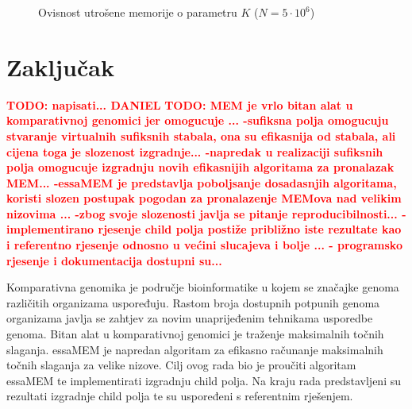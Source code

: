 \documentclass[times, utf8, seminar, numeric]{fer}
\newcommand\todo[1]{\textbf{\textcolor{red}{TODO: #1}}}
\begin{document}
\begin{figure}[!h]
	\centering
	\def\svgwidth{.7\columnwidth}
	
  \caption{Ovisnost utrošene memorije o parametru $K$ ($N = 5 \cdot 10^6$)}
\end{figure}

\chapter{Zaključak}
\todo{napisati... DANIEL}
\todo{MEM je vrlo bitan alat u komparativnoj genomici jer omogucuje ... -sufiksna polja omogucuju stvaranje virtualnih sufiksnih stabala, ona su efikasnija od stabala, ali cijena toga je slozenost izgradnje... -napredak u realizaciji sufiksnih polja omogucuje izgradnju novih efikasnijih algoritama za pronalazak MEM... -essaMEM je predstavlja poboljsanje dosadasnjih algoritama, koristi slozen postupak pogodan za pronalazenje MEMova nad velikim nizovima ... -zbog svoje slozenosti javlja se pitanje reproducibilnosti... - implementirano rjesenje child polja postiže približno iste rezultate kao i referentno rjesenje odnosno u većini slucajeva i bolje ... - programsko rjesenje i dokumentacija dostupni su...}




\begin{sazetak}
Komparativna genomika je područje bioinformatike u kojem se značajke genoma različitih organizama uspoređuju. Rastom broja dostupnih potpunih genoma organizama javlja se zahtjev za novim unaprijeđenim tehnikama usporedbe genoma. Bitan alat u komparativnoj genomici je traženje maksimalnih točnih slaganja. essaMEM je napredan algoritam za efikasno računanje maksimalnih točnih slaganja za velike nizove. Cilj ovog rada bio je proučiti algoritam essaMEM te implementirati izgradnju child polja. Na kraju rada predstavljeni su rezultati izgradnje child polja te su uspoređeni s referentnim rješenjem.

\end{sazetak}
\end{document}
